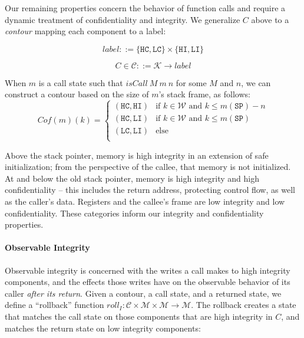 \documentclass{article}
\begin{document}
      Our remaining properties concern the behavior of function calls and require a dynamic treatment
      of confidentiality and integrity. We generalize \(C\) above to a {\it contour} mapping each component
      to a label:

      \[\mathit{label} ::= \{\mathtt{HC},\mathtt{LC}\} \times \{\mathtt{HI},\mathtt{LI}\}\]

      \[C \in \mathcal{C} ::= \mathcal{K} \rightarrow \mathit{label}\]

      When \(m\) is a call state such that \(\mathit{isCall}\ M\ m\ n\) for some \(M\) and \(n\),
      we can construct a contour based on the size of \(m\)'s stack frame, as follows:
      \[Cof(m)(k) =
      \begin{cases}
        (\mathtt{HC},\mathtt{HI}) & \text{if } k \in \mathcal{W}
                                    \text{ and } k \leq m(\mathtt{SP}) - n \\
        (\mathtt{HC},\mathtt{LI}) & \text{if } k \in \mathcal{W}
                                    \text{ and } k \leq m(\mathtt{SP}) \\
        (\mathtt{LC},\mathtt{LI}) & \text{else} \\
      \end{cases}\]

      Above the stack pointer, memory is high integrity in an extension of safe initialization;
      from the perspective of the callee, that memory is not initialized. At and below the old stack
      pointer, memory is high integrity and high confidentiality -- this includes the return address,
      protecting control flow, as well as the caller's data. Registers and the callee's
      frame are low integrity and low confidentiality. These categories inform our integrity
      and confidentiality properties.

    \paragraph{Observable Integrity}

      Observable integrity is concerned with the writes a call makes to high integrity components,
      and the effects those writes have on the observable behavior of its caller
      {\it after its return}. Given a contour, a call state, and a returned state, we define
      a ``rollback'' function \(\mathit{roll}_I : \mathcal{C} \times \mathcal{M} \times \mathcal{M}
      \rightarrow \mathcal{M}\). The rollback creates a state that matches the call
      state on those components that are high integrity in \(C\), and matches the return state
      on low integrity components:
\end{document}
